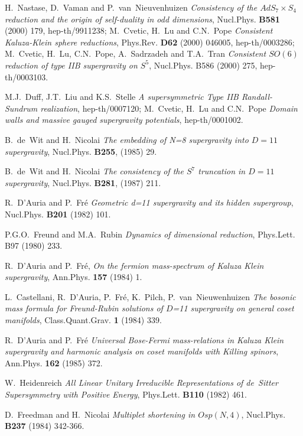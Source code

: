 \documentclass[a4paper,11pt]{article}
\begin{document}
\begin{thebibliography}{99}

H.~Nastase, D.~Vaman and P.~van~Nieuvenhuizen {\it Consistency of
the $AdS_7\times S_4$ reduction and the origin of self-duality in
odd dimensions}, Nucl.Phys. {\bf B581} (2000) 179, hep-th/9911238;
M.~Cvetic, H.~Lu and C.N.~Pope {\it Consistent Kaluza-Klein sphere
reductions}, Phys.Rev. {\bf D62} (2000) 046005, hep-th/0003286;
M.~Cvetic, H.~Lu, C.N.~Pope, A.~Sadrzadeh and T.A.~Tran {\it
Consistent $SO(6)$ reduction of type IIB supergravity on $S^5$},
Nucl.Phys. {B586} (2000) 275, hep-th/0003103.

M.J.~Duff, J.T.~Liu and K.S.~Stelle {\it A supersymmetric Type IIB
Randall-Sundrum realization}, hep-th/0007120; M.~Cvetic, H.~Lu and
C.N.~Pope {\it Domain walls and massive gauged supergravity
potentials}, hep-th/0001002.

B.~de~Wit and H.~Nicolai {\it The embedding of N=8 supergravity
into $D=11$ supergravity}, Nucl.Phys. {\bf B255}, (1985) 29.

B.~de~Wit and H.~Nicolai {\it The consistency of the $S^7$
truncation in $D=11$ supergravity}, Nucl.Phys. {\bf B281}, (1987)
211.

R.~D'Auria and P.~Fr\'e {\it Geometric d=11 supergravity and its
hidden supergroup}, Nucl.Phys. {\bf B201} (1982) 101.

P.G.O.~Freund and M.A.~Rubin {\it Dynamics of dimensional
reduction}, Phys.Lett. {B97} (1980) 233.

R.~D'Auria and P.~Fr\'e, {\it On the fermion mass-spectrum of
Kaluza Klein supergravity}, Ann.Phys. {\bf 157} (1984) 1.

L.~Castellani, R.~D'Auria, P.~Fr\'e, K.~Pilch,
P.~van~Nieuwenhuizen {\it The bosonic mass formula for
Freund-Rubin solutions of $D$=11 supergravity on general coset
manifolds}, Class.Quant.Grav. {\bf 1} (1984) 339.

R.~D'Auria and P.~Fr\'e {\it Universal Bose-Fermi mass-relations
in Kaluza Klein supergravity and harmonic analysis on coset
manifolds with Killing spinors}, Ann.Phys. {\bf 162} (1985) 372.

W.~Heidenreich {\it All Linear Unitary Irreducible Representations
of de~Sitter Supersymmetry with Positive Energy}, Phys.Lett. {\bf
B110} (1982) 461.

D.~Freedman and H.~Nicolai {\it Multiplet shortening in
$Osp(N,4)$}, Nucl.Phys. {\bf B237} (1984) 342-366.


\end{thebibliography}
\end{document}
